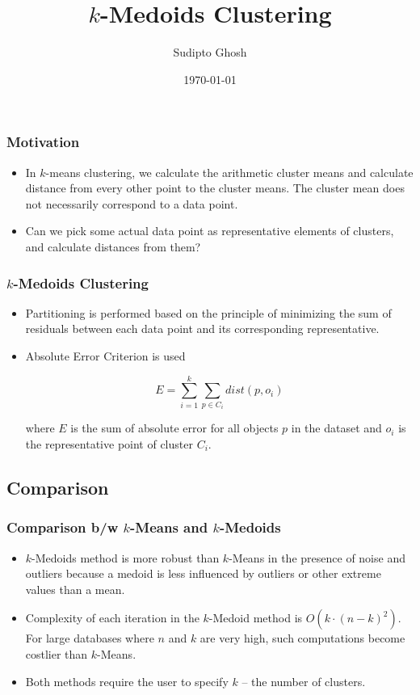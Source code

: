 \documentclass{beamer}
\title{$k$-Medoids Clustering}
\author{Sudipto Ghosh}
\institute{\emph{M.Sc. CS Semester I\\Department of Computer Science\\University of Delhi}}
\date{\today}
\begin{document}
\begin{frame}
    \titlepage
\end{frame}

\begin{frame}
    \frametitle{Motivation}
    \begin{itemize}
        \item In $k$-means clustering, we calculate the arithmetic cluster means and calculate distance from every other point to the cluster means. The cluster mean does not necessarily correspond to a data point.
        \item Can we pick some actual data point as representative elements
        of clusters, and calculate distances from them?
    \end{itemize}
\end{frame}

\begin{frame}
    \frametitle{$k$-Medoids Clustering}
    \begin{itemize}
        \item Partitioning is performed based on the principle of minimizing the sum of residuals between each data point and its corresponding representative.
        \item Absolute Error Criterion is used
        
        \begin{equation*}
            E = \sum_{i=1}^k \sum_{p \in C_i} dist(p, o_i)
        \end{equation*}
        
        where $E$ is the sum of absolute error for all objects $p$ in the dataset and $o_i$ is the representative point of cluster $C_i$.
    \end{itemize}
\end{frame}

\subsection{Comparison}
\begin{frame}
    \frametitle{Comparison b/w $k$-Means and $k$-Medoids}
    \begin{itemize}
        \item $k$-Medoids method is more robust than $k$-Means in the 
        presence of noise and outliers because a medoid is less influenced by outliers or other extreme values than a mean.
        \item Complexity of each iteration in the $k$-Medoid method is $O(k \cdot (n-k)^2)$. For large databases where $n$ and $k$ are very high, such computations become costlier than $k$-Means.
        \item Both methods require the user to specify $k$ -- the number of clusters.
    \end{itemize}
 \end{frame}
\end{document}

